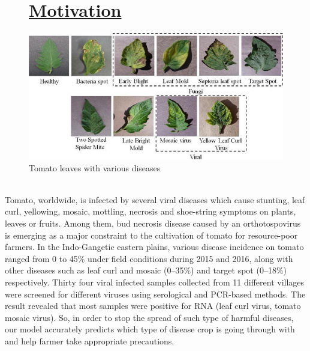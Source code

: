 \documentclass[12pt,a4paper, oneside]{article}
\begin{document}
\pagebreak
\begin{figure}


\section{\underline{Motivation}}
\includegraphics[width=450]{images/motivation.jpg}
\caption{Tomato leaves with various diseases}
\end{figure}\\
Tomato, worldwide, is infected by several viral diseases which cause stunting, leaf curl, yellowing, mosaic, mottling, necrosis and shoe-string symptoms on plants, leaves or fruits. Among them, bud necrosis disease caused by an orthotospovirus is emerging as a major constraint to the cultivation of tomato for resource-poor farmers. In the Indo-Gangetic eastern plains, various disease incidence on tomato ranged from 0 to 45\% under field conditions during 2015 and 2016, along with other diseases such as leaf curl and mosaic (0–35\%) and target spot (0–18\%) respectively. Thirty four viral infected samples collected from 11 different villages were screened for different viruses using serological and PCR-based methods. The result revealed that most samples were positive for RNA (leaf curl virus, tomato mosaic virus). So, in order to stop the spread of such type of harmful diseases, our model accurately predicts which type of disease crop is going through with and help farmer take appropriate precautions.
\end{document}
